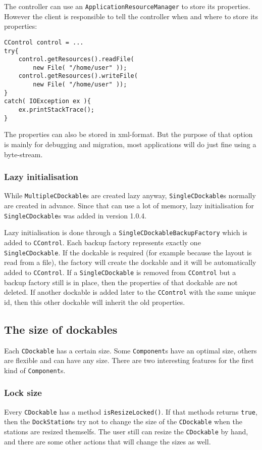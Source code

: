 \documentclass[a4paper,10pt]{article}
\newcommand{\src}[1]{\lstinline[basicstyle=\ttfamily]|#1|}
\begin{document}
The controller can use an \src{ApplicationResourceManager} to store its properties. However the client is responsible to tell the controller when and where to store its properties:
\begin{lstlisting}
CControl control = ...
try{
	control.getResources().readFile(
		new File( "/home/user" ));
	control.getResources().writeFile(
		new File( "/home/user" ));
}
catch( IOException ex ){
	ex.printStackTrace();
}
\end{lstlisting}
The properties can also be stored in xml-format. But the purpose of that option is mainly for debugging and migration, most applications will do just fine using a byte-stream.

\subsubsection{Lazy initialisation}
While \src{MultipleCDockable}s are created lazy anyway, \src{SingleCDockable}s normally are created in advance. Since that can use a lot of memory, lazy initialisation for \src{SingleCDockable}s was added in version 1.0.4.

Lazy initialisation is done through a \src{SingleCDockableBackupFactory} which is added to \src{CControl}. Each backup factory represents exactly one \\\src{SingleCDockable}. If the dockable is required (for example because the layout is read from a file), the factory will create the dockable and it will be automatically added to \src{CControl}. If a \src{SingleCDockable} is removed from \src{CControl} but a backup factory still is in place, then the properties of that dockable are not deleted. If another dockable is added later to the \src{CControl} with the same unique id, then this other dockable will inherit the old properties.

\subsection{The size of dockables}
Each \src{CDockable} has a certain size. Some \src{Component}s have an optimal size, others are flexible and can have any size. There are two interesting features for the first kind of \src{Component}s.

\subsubsection{Lock size}
Every \src{CDockable} has a method \src{isResizeLocked()}. If that methods returns \src{true}, then the \src{DockStation}s try not to change the size of the \src{CDockable} when the stations are resized themselfs. The user still can resize the \src{CDockable} by hand, and there are some other actions that will change the sizes as well.
\end{document}
